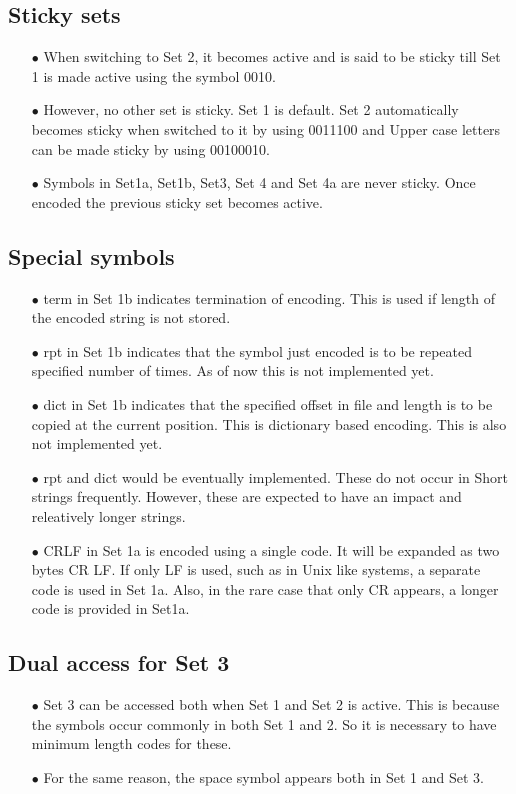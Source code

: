 \documentclass[]{article}
\begin{document}
\subsection{Sticky sets}
\begin{itemize}
	\item[$\bullet$] When switching to Set 2, it becomes active and is said to be sticky till Set 1 is made active using the symbol 0010.
	\item[$\bullet$] However, no other set is sticky. Set 1 is default. Set 2 automatically becomes sticky when switched to it by using 0011100 and Upper case letters can be made sticky by using 00100010.
    \item[$\bullet$] Symbols in Set1a, Set1b, Set3, Set 4 and Set 4a are never sticky. Once encoded the previous sticky set becomes active.
\end{itemize}

\subsection{Special symbols}
\begin{itemize}
	\item[$\bullet$] term in Set 1b indicates termination of encoding.  This is used if length of the encoded string is not stored.
	\item[$\bullet$] rpt in Set 1b indicates that the symbol just encoded is to be repeated specified number of times. As of now this is not implemented yet.
	\item[$\bullet$] dict in Set 1b indicates that the specified offset in file and length is to be copied at the current position. This is dictionary based encoding. This is also not implemented yet.
	\item[$\bullet$] rpt and dict would be eventually implemented. These do not occur in Short strings frequently.  However, these are expected to have an impact and releatively longer strings.
	\item[$\bullet$] CRLF in Set 1a is encoded using a single code. It will be expanded as two bytes CR LF.  If only LF is used, such as in Unix like systems, a separate code is used in Set 1a.  Also, in the rare case that only CR appears, a longer code is provided in Set1a.
\end{itemize}

\subsection{Dual access for Set 3}
\begin{itemize}
	\item[$\bullet$] Set 3 can be accessed both when Set 1 and Set 2 is active.  This is because the symbols occur commonly in both Set 1 and 2.  So it is necessary to have minimum length codes for these.
	\item[$\bullet$] For the same reason, the space symbol appears both in Set 1 and Set 3.
\end{itemize}
\end{document}

